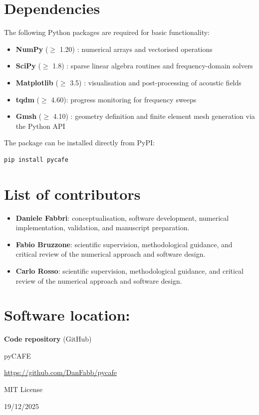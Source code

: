 \documentclass{jors}
\begin{document}
\section*{Dependencies}
The following Python packages are required for basic functionality:
\begin{itemize}
    \item \textbf{NumPy} ($\geq$ 1.20) \cite{Harris2020}: numerical arrays and vectorised operations
    \item \textbf{SciPy} ($\geq$ 1.8) \cite{Virtanen2020}: sparse linear algebra routines and frequency-domain solvers
    \item \textbf{Matplotlib} ($\geq$ 3.5) \cite{Hunter2007}: visualisation and post-processing of acoustic fields
    \item \textbf{tqdm} ($\geq$ 4.60): progress monitoring for frequency sweeps
    \item \textbf{Gmsh} ($\geq$ 4.10) \cite{Gmsh2009}: geometry definition and finite element mesh generation via the Python API
\end{itemize}
The package can be installed directly from PyPI:
\begin{verbatim}
pip install pycafe
\end{verbatim}

\section*{List of contributors}

\begin{itemize}
    \item \textbf{Daniele Fabbri}: conceptualisation, software development, numerical implementation, validation, and manuscript preparation.
    \item \textbf{Fabio Bruzzone}: scientific supervision, methodological guidance, and critical review of the numerical approach and software design.
    \item \textbf{Carlo Rosso}: scientific supervision, methodological guidance, and critical review of the numerical approach and software design.
\end{itemize}


\section*{Software location:}

{\bf Code repository} (GitHub)

\begin{description}[noitemsep,topsep=0pt]
	\item[Name:] pyCAFE
	\item[Persistent identifier:] \url{https://github.com/DanFabb/pycafe}
	\item[Licence:] MIT License
	\item[Date published:] 19/12/2025
\end{description}
\end{document}
